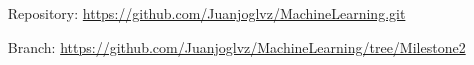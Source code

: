 \documentclass[idxtotoc,hyperref,openany]{labbook} %
\begin{document}
\begin{itemize}
\item[Repository:] \href{https://github.com/Juanjoglvz/MachineLearning.git}{https://github.com/Juanjoglvz/MachineLearning.git}
\item[Branch:] \href{https://github.com/Juanjoglvz/MachineLearning/tree/Milestone2}{https://github.com/Juanjoglvz/MachineLearning/tree/Milestone2}
\end{itemize}
\end{document}
